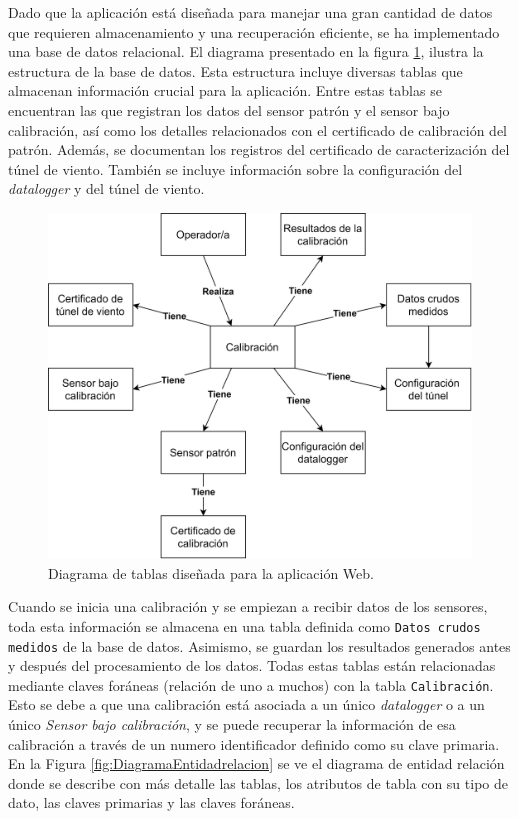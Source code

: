 Dado que la aplicación está diseñada para manejar una gran cantidad de datos que requieren almacenamiento y una recuperación eficiente, se ha implementado una base de datos relacional. El diagrama presentado en la figura \ref{fig:DiagramaSimplificadoBd}, ilustra la estructura de la base de datos. Esta estructura incluye diversas tablas que almacenan información crucial para la aplicación. Entre estas tablas se encuentran las que registran los datos del sensor patrón y el sensor bajo calibración, así como los detalles relacionados con el certificado de calibración del patrón. Además, se documentan los registros del certificado de caracterización del túnel de viento. También se incluye información sobre la configuración del \textit{datalogger} y del túnel de viento.
\begin{figure}[H]
    \centering
    \includegraphics[width=0.8\linewidth]{Figuras/AplicacionWeb/backend/DiagramaSimplificadoBd.png}
    \caption{Diagrama de tablas diseñada para la aplicación Web.}
    \label{fig:DiagramaSimplificadoBd}
\end{figure}

Cuando se inicia una calibración y se empiezan a recibir datos de los sensores, toda esta información se almacena en una tabla definida como \texttt{Datos crudos medidos} de la base de datos. Asimismo, se guardan los resultados generados antes y después del procesamiento de los datos. Todas estas tablas están relacionadas mediante claves foráneas (relación de uno a muchos) con la tabla \texttt{Calibración}. Esto se debe a que una calibración está asociada a un único \textit{datalogger} o a un único \textit{Sensor bajo calibración}, y se puede recuperar la información de esa  calibración a través de un numero identificador definido como su clave primaria. En la Figura \ref{fig:DiagramaEntidadrelacion} se ve el diagrama de entidad relación donde se describe con más detalle las tablas, los atributos de tabla con su tipo de dato, las claves primarias y las claves foráneas.


